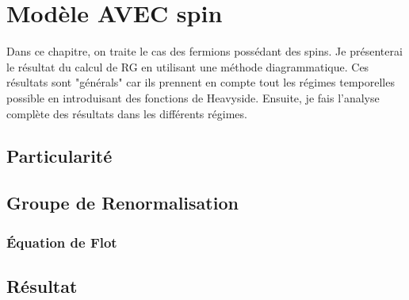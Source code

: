\chapter{Modèle AVEC spin}
\begin{Abstract}
    \begin{changemargin}{2cm}{2cm}
    Dans ce chapitre, on traite le cas des fermions possédant des spins. Je
    présenterai le résultat du calcul de RG en utilisant une méthode
    diagrammatique. Ces résultats sont "générals" car ils prennent en compte
    tout les régimes temporelles possible en introduisant des fonctions de
    Heavyside. Ensuite, je fais l'analyse complète des résultats dans les
    différents régimes.
    \end{changemargin}
\end{Abstract}

\section{Particularité}

\section{Groupe de Renormalisation}

\subsection{Équation de Flot}

\section{Résultat}
